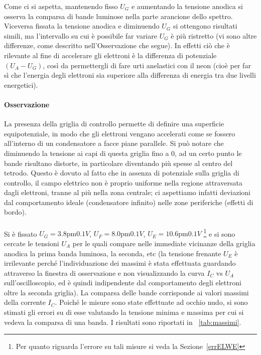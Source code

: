 \documentclass[10pt,a4paper]{article}
\begin{document}
Come ci si aspetta, mantenendo fisso $U_{G}$ e aumentando la tensione anodica si osserva la comparsa di bande luminose nella parte arancione dello spettro.
Viceversa fissata la tensione anodica e diminuendo $U_{G}$ si ottengono risultati simili, ma l'intervallo su cui è possibile far variare $U_{G}$ è più ristretto (vi sono altre differenze, come descritto nell'Osservazione che segue). In effetti ciò che è rilevante al fine di accelerare gli elettroni è la differenza di potenziale $(U_{A}-U_{G})$, così da permettergli di fare urti anelastici con il neon (cioè per far sì che l'energia degli elettroni sia superiore alla differenza di energia tra due livelli energetici).

\paragraph{Osservazione} La presenza della griglia di controllo permette di definire una superficie equipotenziale, in modo che gli elettroni vengano accelerati come se fossero all'interno di un condensatore a facce piane parallele. Si può notare che diminuendo la tensione ai capi di questa griglia fino a 0, ad un certo punto le bande risultano distorte, in particolare diventando più spesse al centro del tetrodo. Questo è dovuto al fatto che in assenza di potenziale sulla griglia di controllo, il campo elettrico non è proprio uniforme nella regione attraversata dagli elettroni, tranne al più nella zona centrale; ci aspettiamo infatti deviazioni dal comportamento ideale (condensatore infinito) nelle zone periferiche (effetti di bordo).

\paragraph{} Si è fissato $U_{G} = \unit{3.8 \pm 0.1}{V}$, $U_{F}=\unit{8.0 \pm 0.1}{V}$, $U_{E} = \unit{10.6 \pm 0.1}{V}$ \footnote{Per quanto riguarda l'errore su tali misure si veda la Sezione~\ref{errELWE}} e si sono cercate le tensioni $U_{A}$ per le quali compare nelle immediate vicinanze della griglia anodica la prima banda luminosa, la seconda, etc (la tensione frenante $U_E$ è irrilevante perché l'individuazione dei massimi è stata effettuata guardando attraverso la finestra di osservazione e non visualizzando la curva $I_{C}$ vs $U_{A}$ sull'oscilloscopio, ed è quindi indipendente dal comportamento degli elettroni oltre la seconda griglia). La comparsa delle bande corrisponde ai valori massimi della corrente $I_{C}$. Poiché le misure sono state effettuate ad occhio nudo, si sono stimati gli errori su di esse valutando la tensione minima e massima per cui si vedeva la comparsa di una banda. I risultati sono riportati in \tablename{~\ref{tab:massimi}}.
\end{document}
